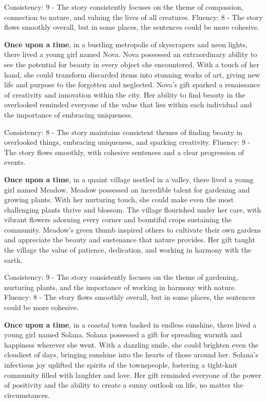 \documentclass{article}
\begin{document}
Consistency: 9 - The story consistently focuses on the theme of compassion, connection to nature, and valuing the lives of all creatures.
Fluency: 8 - The story flows smoothly overall, but in some places, the sentences could be more cohesive.

\textbf{Once upon a time}, in a bustling metropolis of skyscrapers and neon lights, there lived a young girl named Nova. Nova possessed an extraordinary ability to see the potential for beauty in every object she encountered. With a touch of her hand, she could transform discarded items into stunning works of art, giving new life and purpose to the forgotten and neglected. Nova's gift sparked a renaissance of creativity and innovation within the city. Her ability to find beauty in the overlooked reminded everyone of the value that lies within each individual and the importance of embracing uniqueness.

Consistency: 8 - The story maintains consistent themes of finding beauty in overlooked things, embracing uniqueness, and sparking creativity.
Fluency: 9 - The story flows smoothly, with cohesive sentences and a clear progression of events.

\textbf{Once upon a time}, in a quaint village nestled in a valley, there lived a young girl named Meadow. Meadow possessed an incredible talent for gardening and growing plants. With her nurturing touch, she could make even the most challenging plants thrive and blossom. The village flourished under her care, with vibrant flowers adorning every corner and bountiful crops sustaining the community. Meadow's green thumb inspired others to cultivate their own gardens and appreciate the beauty and sustenance that nature provides. Her gift taught the village the value of patience, dedication, and working in harmony with the earth.

Consistency: 9 - The story consistently focuses on the theme of gardening, nurturing plants, and the importance of working in harmony with nature.
Fluency: 8 - The story flows smoothly overall, but in some places, the sentences could be more cohesive.

\textbf{Once upon a time}, in a coastal town basked in endless sunshine, there lived a young girl named Solana. Solana possessed a gift for spreading warmth and happiness wherever she went. With a dazzling smile, she could brighten even the cloudiest of days, bringing sunshine into the hearts of those around her. Solana's infectious joy uplifted the spirits of the townspeople, fostering a tight-knit community filled with laughter and love. Her gift reminded everyone of the power of positivity and the ability to create a sunny outlook on life, no matter the circumstances.
\end{document}
